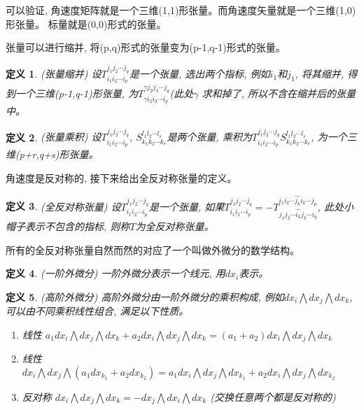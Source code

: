 \documentclass{ctexart}
\numberwithin{equation}{subsection}
\numberwithin{theorem}{subsection}
\newtheorem{definition} {定义}
\numberwithin{definition}{subsection}
\numberwithin{proof}{subsection}
\numberwithin{lemma}{subsection}
\numberwithin{example}{subsection}
\numberwithin{remark}{subsection}
\numberwithin{corollary}{subsection}
\numberwithin{exercise}{subsection}
\numberwithin{problem}{subsection}
\numberwithin{question}{section}
\numberwithin{method}{subsection}
\begin{document}
    可以验证, 角速度矩阵就是一个三维(1,1)形张量。而角速度矢量就是一个三维(1,0)形张量。
    标量就是(0,0)形式的张量。

    张量可以进行缩并, 将(p,q)形式的张量变为(p-1,q-1)形式的张量。

    \begin{definition}
        \label{1.3 def:tensor contraction}
        (张量缩并) 设\(T_{i_1i_2\cdots i_p}^{j_1j_2\cdots j_q}\)是一个张量,
        选出两个指标, 例如\(i_1\)和\(j_1\), 将其缩并, 得到一个三维(p-1,q-1)形张量,
        为\(T_{\gamma i_2i_3\cdots i_p}^{\gamma j_2j_3\cdots j_q}\)(此处\(\gamma\)
        求和掉了, 所以不含在缩并后的张量中。
    \end{definition}

    \begin{definition}
        \label{1.3 def:tensor product}
        (张量乘积) 设\(T_{i_1i_2\cdots i_p}^{j_1j_2\cdots j_q}\), 
        \(S_{k_1k_2\cdots k_r}^{l_1l_2\cdots l_s}\)是两个张量,
        乘积为\(T_{i_1i_2\cdots i_p}^{j_1j_2\cdots j_q} S_{k_1k_2\cdots k_r}^{l_1l_2\cdots l_s}\),
        为一个三维(p+r,q+s)形张量。
    \end{definition}

    角速度是反对称的, 接下来给出全反对称张量的定义。

    \begin{definition}
        \label{1.3 def:antisymmetric tensor}
        (全反对称张量) 设\(T_{i_1i_2\cdots i_p}^{j_1j_2\cdots j_q}\)是一个张量,
        如果\(T_{i_1i_2\cdots i_p}^{j_1j_2\cdots j_q} = -T_{j_1j_2\cdots \hat{i_k} j_k \cdots i_q}^{i_1i_2\cdots \hat{j_k} i_k \cdots j_p}\),
        此处小帽子表示不包含的指标, 则称\(T\)为全反对称张量。
    \end{definition}

    所有的全反对称张量自然而然的对应了一个叫做外微分的数学结构。

    \begin{definition}
        \label{1.3 def:1 exterior derivative}
        (一阶外微分) 一阶外微分表示一个线元, 用\(dx_i\)表示。
    \end{definition}

    \begin{definition}
        \label{1.3 def:high exterior derivative}
        (高阶外微分) 高阶外微分由一阶外微分的乘积构成, 例如\(dx_i \bigwedge dx_j \bigwedge dx_k\),
        可以由不同乘积线性组合, 满足以下性质。
        \begin{enumerate}
            \item 线性 \(a_1 dx_i \bigwedge dx_j \bigwedge dx_k + a_2 dx_i \bigwedge dx_j \bigwedge dx_k = (a_1 + a_2) dx_i \bigwedge dx_j \bigwedge dx_k\)
            \item 线性 \(dx_i \bigwedge dx_j \bigwedge (a_1dx_{k_1} + a_2dx_{k_2}) = a_1 dx_i \bigwedge dx_j \bigwedge dx_{k_1} + a_2 dx_i \bigwedge dx_j \bigwedge dx_{k_2} \)
            \item 反对称 \(dx_i \bigwedge dx_j \bigwedge dx_k = -dx_j \bigwedge dx_i \bigwedge dx_k\) (交换任意两个都是反对称的)
        \end{enumerate}
    \end{definition}
\end{document}
